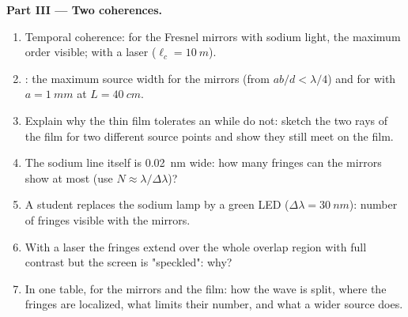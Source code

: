 \begin{problem}
\medskip
\noindent\textbf{Part III --- Two coherences.}
\begin{enumerate}[resume]
  \item Temporal coherence: for the Fresnel mirrors with sodium light,
        the maximum order visible; with a laser ($\ell_c = \qty{10}{m}$).
  \item {}: the maximum source width for the mirrors
        (from $ab/d < \lambda/4$) and for  with $a = \qty{1}{mm}$ at
        $L = \qty{40}{cm}$.
  \item Explain why the thin film tolerates an  while
         do not: sketch the two rays of the film for two
        different source points and show they still meet on the film.
  \item The sodium line itself is \qty{0.02}{nm} wide: how many fringes
        can the mirrors show at most (use $N \approx \lambda/\Delta\lambda$)?
  \item A student replaces the sodium lamp by a green LED ($\Delta\lambda =
        \qty{30}{nm}$): number of fringes visible with the mirrors.
  \item With a laser the fringes extend over the whole overlap region
        with full contrast but the screen is "speckled": why?
  \item In one table, for the mirrors and the film: how the wave is
        split, where the fringes are localized, what limits their
        number, and what a wider source does.
\end{enumerate}
\end{problem}

